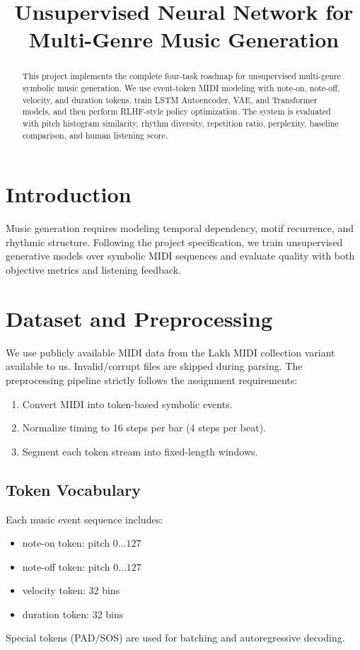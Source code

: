 \documentclass[conference]{IEEEtran}
\title{Unsupervised Neural Network for Multi-Genre Music Generation}
\author{\IEEEauthorblockN{Student Group Name}}
\begin{document}
\maketitle

\begin{abstract}
This project implements the complete four-task roadmap for unsupervised multi-genre symbolic music generation. We use event-token MIDI modeling with note-on, note-off, velocity, and duration tokens, train LSTM Autoencoder, VAE, and Transformer models, and then perform RLHF-style policy optimization. The system is evaluated with pitch histogram similarity, rhythm diversity, repetition ratio, perplexity, baseline comparison, and human listening score.
\end{abstract}

\section{Introduction}
Music generation requires modeling temporal dependency, motif recurrence, and rhythmic structure. Following the project specification, we train unsupervised generative models over symbolic MIDI sequences and evaluate quality with both objective metrics and listening feedback.

\section{Dataset and Preprocessing}
We use publicly available MIDI data from the Lakh MIDI collection variant available to us. Invalid/corrupt files are skipped during parsing. The preprocessing pipeline strictly follows the assignment requirements:
\begin{enumerate}
    \item Convert MIDI into token-based symbolic events.
    \item Normalize timing to 16 steps per bar (4 steps per beat).
    \item Segment each token stream into fixed-length windows.
\end{enumerate}

\subsection{Token Vocabulary}
Each music event sequence includes:
\begin{itemize}
    \item note-on token: pitch $0\ldots127$
    \item note-off token: pitch $0\ldots127$
    \item velocity token: 32 bins
    \item duration token: 32 bins
\end{itemize}
Special tokens (PAD/SOS) are used for batching and autoregressive decoding.
\end{document}
